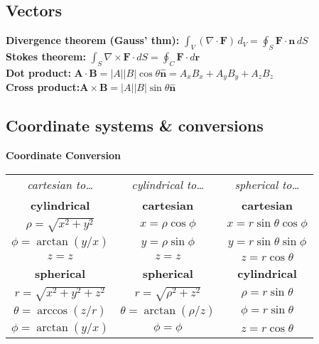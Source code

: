 \documentclass[letterpaper,landscape,10pt]{article}
\begin{document}
{\begin{multicols}{3}
	\subsection*{Vectors}
	\textbf{Divergence theorem (Gauss' thm):}
		$ \int_{V}(\nabla\cdot \bm{F}) \, d_{V} =
			\oint_S \bm{F} \cdot \bm{n} \, dS $\\
	\textbf{Stokes theorem:}
	$ \int_S \nabla \times \bm{F} \cdot dS = \oint_C \bm{F}\cdot d\bm{r} $\\
	\textbf{Dot product:} $ \bm{A} \cdot \bm{B} = |A||B|\cos\theta\bm{\hat{n}} = A_xB_x+A_yB_y+A_zB_z$ \\
	\textbf{Cross product:}$ \bm{A} \times \bm{B} = |A||B|\sin\theta \bm{\hat{n}}  $\\


	\subsection*{Coordinate systems \& conversions}
	\begin{center}
	\textbf{Coordinate Conversion}\\
	\vspace{2.5pt}
	\begin{tabular}{ c !{\color{black}\vline} c !{\color{black}\vline} c }
		\setlength\arrayrulewidth{1pt}
		\textit{cartesian to\dots} & \textit{cylindrical to\dots} &
			\textit{spherical to\dots} \\
		\textbf{cylindrical}    & \textbf{cartesian} & \textbf{cartesian} \\
		$\rho=\sqrt{x^2+y^2}$ & $x=\rho\cos\phi$ & $x=r\sin\theta\cos\phi$ \\
		$\phi=\arctan(y/x)$    & $y=\rho\sin\phi$ & $y=r\sin\theta\sin\phi$ \\
		$z = z$               & $z=z$            & $z=r\cos\theta$\\
		\textbf{spherical}      & \textbf{spherical} & \textbf{cylindrical} \\
		$r=\sqrt{x^2+y^2+z^2}$& $r=\sqrt{\rho^2+z^2}$&$\rho=r\sin\theta$ \\
		$\theta=\arccos(z/r)$  & $\theta=\arctan(\rho/z)$&$\phi=r\sin\theta$ \\
		$\phi=\arctan(y/x)$    & $\phi=\phi$      & $z=r\cos\theta$ \\
	\end{tabular}
	\vspace{5pt}\\


\end{center}
\end{multicols}}
\end{document}

